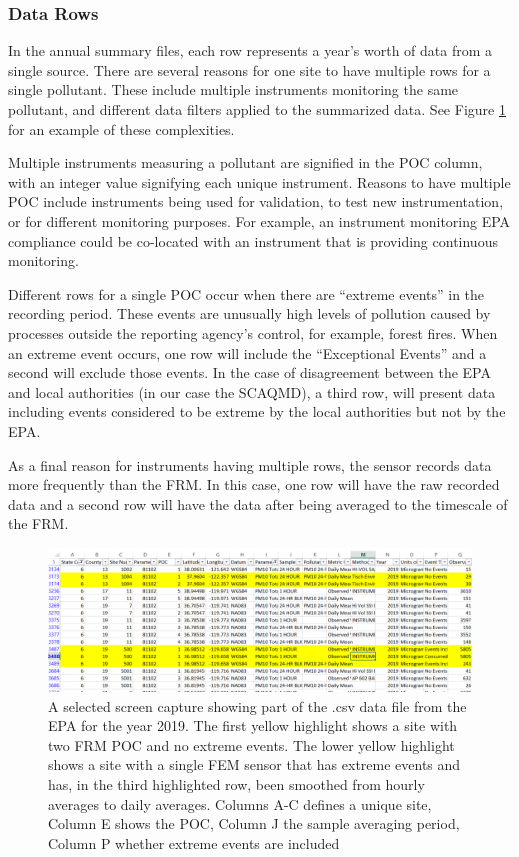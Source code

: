 \documentclass{article}
\begin{document}
\subsubsection*{Data Rows} \label{subsubsec:DataRows}
In the annual summary files, each row represents a year's worth of data from a single source. There are several reasons for one site to have multiple rows for a single pollutant.  These include multiple instruments monitoring the same pollutant, and different data filters applied to the summarized data.  See Figure  \ref{fig:Example_Raw_EPA_Data} for an example of these complexities.

Multiple instruments measuring a pollutant are signified in the \ac{POC} column, with an integer value signifying each unique instrument.  Reasons to have multiple \ac{POC} include instruments being used for validation, to test new instrumentation, or for different monitoring purposes.  For example, an instrument monitoring \ac{EPA} compliance could be co-located with an instrument that is providing continuous monitoring.

Different rows for a single \ac{POC} occur when there are ``extreme events'' in the recording period.  These events are unusually high levels of pollution caused by processes outside the reporting agency's control, for example, forest fires.  When an extreme event occurs, one row will include the ``Exceptional Events'' and a second will exclude those events.  In the case of disagreement between the \ac{EPA} and local authorities (in our case the \ac{SCAQMD}), a third row, will present data including events considered to be extreme by the local authorities but not by the \ac{EPA}.

As a final reason for instruments having multiple rows, the sensor records data more frequently than the \ac{FRM}.  In this case, one row will have the raw recorded data and a second row will have the data after being averaged to the timescale of the \ac{FRM}.  

\begin{figure}[ht]
    \centering
    \includegraphics[width = \textwidth]{Figures/Validation/Example_Raw_EPA_Data.png}
    \caption{A selected screen capture showing part of the .csv data file from the EPA for the year 2019.  The first yellow highlight shows a site with two \ac{FRM} \ac{POC} and no extreme events.  The lower yellow highlight shows a site with a single \ac{FEM} sensor that has extreme events and has, in the third highlighted row, been smoothed from hourly averages to daily averages.  Columns A-C defines a unique site, Column E shows the \ac{POC}, Column J the sample averaging period, Column P whether extreme events are included}
\label{fig:Example_Raw_EPA_Data}
\end{figure}
\end{document}
